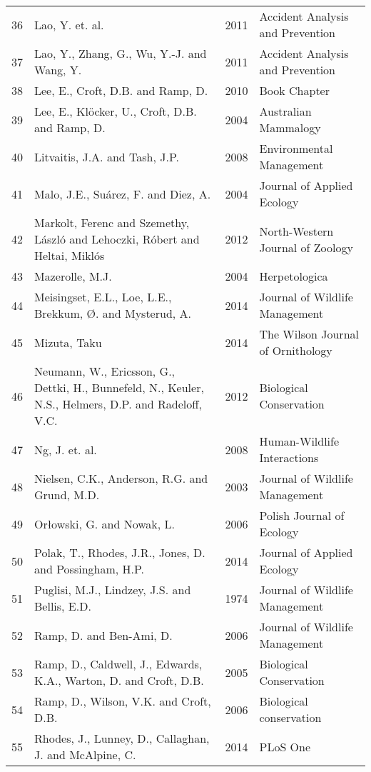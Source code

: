 \begin{table}[htp]
\begin{tabularx}{0.9\textwidth}{lYll}
   36 & Lao, Y. et. al. & 2011 & Accident Analysis and Prevention \\ 
   37 & Lao, Y., Zhang, G., Wu, Y.-J. and Wang, Y. & 2011 & Accident Analysis and Prevention \\ 
   38 & Lee, E., Croft, D.B. and Ramp, D. & 2010 & Book Chapter \\ 
   39 & Lee, E., Klöcker, U., Croft, D.B. and Ramp, D. & 2004 & Australian Mammalogy \\ 
   40 & Litvaitis, J.A. and Tash, J.P. & 2008 & Environmental Management \\ 
   41 & Malo, J.E., Suárez, F. and Diez, A. & 2004 & Journal of Applied Ecology \\ 
   42 & Markolt, Ferenc and Szemethy, L{\'a}szl{\'o} and Lehoczki, R{\'o}bert and Heltai, Mikl{\'o}s & 2012 & North-Western Journal of Zoology \\ 
   43 & Mazerolle, M.J. & 2004 & Herpetologica \\ 
   44 & Meisingset, E.L., Loe, L.E., Brekkum, Ø. and Mysterud, A. & 2014 & Journal of Wildlife Management \\ 
   45 & Mizuta, Taku & 2014 & The Wilson Journal of Ornithology \\ 
   46 & Neumann, W., Ericsson, G., Dettki, H., Bunnefeld, N., Keuler, N.S., Helmers, D.P. and Radeloff, V.C. & 2012 & Biological Conservation  \\ 
   47 & Ng, J. et. al. & 2008 & Human-Wildlife Interactions \\ 
   48 & Nielsen, C.K., Anderson, R.G. and Grund, M.D. & 2003 & Journal of Wildlife Management \\ 
   49 & Orłowski, G. and Nowak, L. & 2006 & Polish Journal of Ecology \\ 
   50 & Polak, T., Rhodes, J.R., Jones, D. and Possingham, H.P. & 2014 & Journal of Applied Ecology \\ 
   51 & Puglisi, M.J., Lindzey, J.S. and Bellis, E.D. & 1974 & Journal of Wildlife Management \\ 
   52 & Ramp, D. and Ben-Ami, D. & 2006 & Journal of Wildlife Management \\ 
   53 & Ramp, D., Caldwell, J., Edwards, K.A., Warton, D. and Croft, D.B. & 2005 & Biological Conservation \\ 
   54 & Ramp, D., Wilson, V.K. and Croft, D.B. & 2006 & Biological conservation \\ 
   55 & Rhodes, J., Lunney, D., Callaghan, J. and McAlpine, C. & 2014 & PLoS One \\ 

\end{tabularx}
\end{table}
